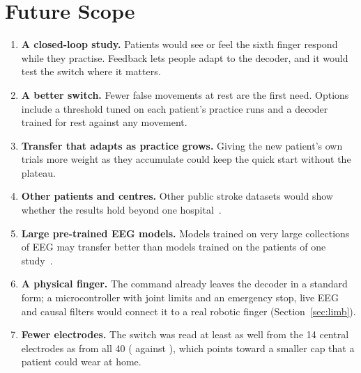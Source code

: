 \section{Future Scope}\label{sec:future}

\begin{enumerate}
  \item \textbf{A closed-loop study.} Patients would see or feel the sixth finger respond
  while they practise. Feedback lets people adapt to the decoder, and it would test the
  switch where it matters.
  \item \textbf{A better switch.} Fewer false movements at rest are the first need. Options
  include a threshold tuned on each patient's practice runs and a decoder trained for rest
  against any movement.
  \item \textbf{Transfer that adapts as practice grows.} Giving the new patient's own trials
  more weight as they accumulate could keep the quick start without the plateau.
  \item \textbf{Other patients and centres.} Other public stroke datasets would show whether
  the results hold beyond one hospital~\cite{liu2024acute,lu2026chronic,liu2025lowerlimb}.
  \item \textbf{Large pre-trained EEG models.} Models trained on very large collections of EEG
  may transfer better than models trained on the patients of one study~\cite{jiang2024labram,wang2025cbramod}.
  \item \textbf{A physical finger.} The command already leaves the decoder in a standard
  form; a microcontroller with joint limits and an emergency stop, live EEG and causal
  filters would connect it to a real robotic finger (Section~\ref{sec:limb}).
  \item \textbf{Fewer electrodes.} The switch was read at least as well from the 14
  central electrodes as from all 40 (\pct{\rqFourCueSfRestCentralMean} against
  \pct{\rqFourCueSfRestAllChannelsMean}), which points toward a smaller cap that a patient
  could wear at home.
\end{enumerate}
